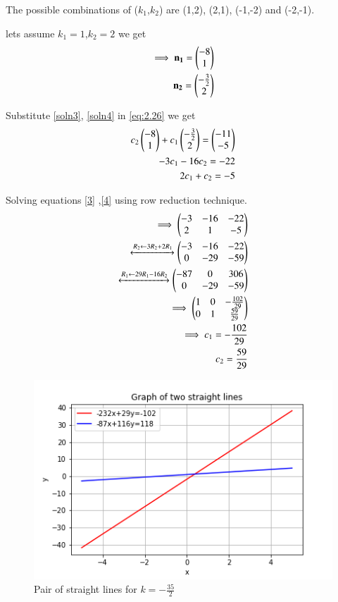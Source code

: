 \documentclass[journal,12pt,twocolumn]{IEEEtran}
\begin{document}
The possible combinations of ($k_1$,$k_2$) are (1,2), (2,1), (-1,-2) and (-2,-1).

lets assume $k_1=1$,$k_2=2$ we get
\begin{align}
    \implies\mathbf{n_1}=\begin{pmatrix}-8\\1\end{pmatrix}\label{soln3}\\
    \mathbf{n_2}=\begin{pmatrix}-\frac{3}{2}\\2\end{pmatrix}\label{soln4}
\end{align}

Substitute \eqref{soln3}, \eqref{soln4} in \eqref{eq:2.26} we get 
\begin{align}
    c_2\begin{pmatrix}-8\\1\end{pmatrix}+c_1\begin{pmatrix}-\frac{3}{2}\\2\end{pmatrix}=\begin{pmatrix} -11\\ -5\end{pmatrix}\\
    -3c_1-16c_2=-22\label{3}\\
    2c_1+c_2=-5\label{4}
\end{align}

Solving equations \eqref{3} ,\eqref{4} using row reduction technique.
\begin{align}
    \implies\begin{pmatrix}-3 & -16 & -22\\2 & 1 & -5\end{pmatrix}\\
    \xleftrightarrow[]{R_2\leftarrow 3R_2+2R_1}\begin{pmatrix}-3 & -16 & -22\\0 & -29 & -59\end{pmatrix}\\
    \xleftrightarrow[]{R_1\leftarrow 29R_1-16R_2}\begin{pmatrix}-87 & 0 & 306\\0 & -29 & -59\end{pmatrix}\\
    \implies\begin{pmatrix}1 & 0 & -\frac{102}{29}\\0 & 1 & \frac{59}{29}\end{pmatrix}\\
    \implies c_1=-\frac{102}{29}\label{c3}\\
    c_2=\frac{59}{29}\label{c4}
\end{align}
\renewcommand{\thefigure}{2}
\begin{figure}[ht!]
    \centering
    \includegraphics[width=\columnwidth]{Figure2}
    \caption{Pair of straight lines for $k=-\frac{35}{2}$}
    \label{fig:figure2}
\end{figure}
\end{document}
